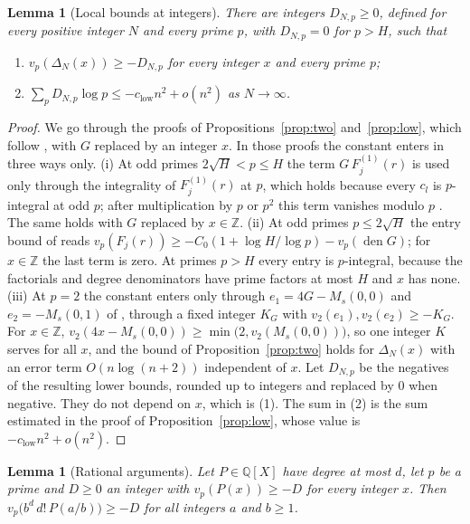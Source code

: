 \documentclass[11pt]{article}
\newtheorem{lemma}[theorem]{Lemma}
\theoremstyle{definition}
\begin{document}
\begin{lemma}[Local bounds at integers]\label{xlem:local}
There are integers $D_{N,p}\ge0$, defined for every positive integer $N$ and every prime $p$, with $D_{N,p}=0$ for $p>H$, such that
\begin{enumerate}
\item $v_p(\Delta_N(x))\ge-D_{N,p}$ for every integer $x$ and every prime $p$;
\item $\sum_pD_{N,p}\log p\le-c_{\mathrm{low}}n^2+o(n^2)$ as $N\to\infty$.
\end{enumerate}
\end{lemma}

\begin{proof}
We go through the proofs of Propositions~\ref{prop:two} and~\ref{prop:low}, which follow \cite[Secs.~2.2 and~3]{OAI}, with $G$ replaced by an integer $x$. In those proofs the constant enters in three ways only.
(i) At odd primes $2\sqrt H<p\le H$ the term $G\,F^{(1)}_j(r)$ is used only through the integrality of $F^{(1)}_j(r)$ at $p$, which holds because every $c_l$ is $p$-integral at odd $p$; after multiplication by $p$ or $p^2$ this term vanishes modulo $p$ \cite[Sec.~3.2, Lemmas~3.2, 3.3]{OAI}. The same holds with $G$ replaced by $x\in\mathbb Z$.
(ii) At odd primes $p\le2\sqrt H$ the entry bound of \cite[Sec.~3.4]{OAI} reads $v_p(F_j(r))\ge-C_0(1+\log H/\log p)-v_p(\operatorname{den}G)$; for $x\in\mathbb Z$ the last term is zero. At primes $p>H$ every entry is $p$-integral, because the factorials and degree denominators have prime factors at most $H$ and $x$ has none.
(iii) At $p=2$ the constant enters only through $e_1=4G-M_s(0,0)$ and $e_2=-M_s(0,1)$ of \cite[Eq.~(24)]{OAI}, through a fixed integer $K_G$ with $v_2(e_1),v_2(e_2)\ge-K_G$. For $x\in\mathbb Z$, $v_2(4x-M_s(0,0))\ge\min\big(2,v_2(M_s(0,0))\big)$, so one integer $K$ serves for all $x$, and the bound of Proposition~\ref{prop:two} holds for $\Delta_N(x)$ with an error term $O(n\log(n+2))$ independent of $x$.
Let $D_{N,p}$ be the negatives of the resulting lower bounds, rounded up to integers and replaced by $0$ when negative. They do not depend on $x$, which is (1). The sum in (2) is the sum estimated in the proof of Proposition~\ref{prop:low}, whose value is $-c_{\mathrm{low}}n^2+o(n^2)$.
\end{proof}

\begin{lemma}[Rational arguments]\label{xlem:binomial}
Let $P\in\mathbb Q[X]$ have degree at most $d$, let $p$ be a prime and $D\ge0$ an integer with $v_p(P(x))\ge-D$ for every integer $x$. Then $v_p\big(b^d\,d!\,P(a/b)\big)\ge-D$ for all integers $a$ and $b\ge1$.
\end{lemma}
\end{document}
